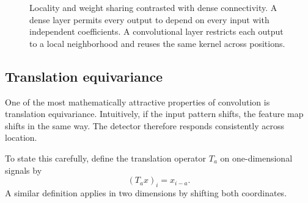 \begin{figure}[t]
\centering
{}
\caption{Locality and weight sharing contrasted with dense connectivity.
A dense layer permits every output to depend on every input with independent coefficients.
A convolutional layer restricts each output to a local neighborhood and reuses the same kernel across positions.}
\label{fig:conv-locality-sharing}
\end{figure}

\subsection*{Translation equivariance}

One of the most mathematically attractive properties of convolution is translation equivariance.
Intuitively, if the input pattern shifts, the feature map shifts in the same way.
The detector therefore responds consistently across location.

To state this carefully, define the translation operator $T_a$ on one-dimensional signals by
\[
 (T_a x)_i = x_{i-a}.
\]
A similar definition applies in two dimensions by shifting both coordinates.

